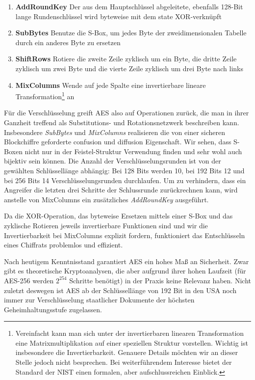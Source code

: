 \begin{enumerate}
	\small
	\item \textbf{AddRoundKey} Der aus dem Hauptschlüssel abgeleitete, ebenfalls 128-Bit lange Rundenschlüssel wird byteweise mit dem state XOR-verknüpft
	\item \textbf{SubBytes} Benutze die S-Box, um jedes Byte der zweidimensionalen Tabelle durch ein anderes Byte zu ersetzen
	\item \textbf{ShiftRows} Rotiere die zweite Zeile zyklisch um ein Byte, die dritte Zeile zyklisch um zwei Byte und die vierte Zeile zyklisch um drei Byte nach links
	\item \textbf{MixColumns} Wende auf jede Spalte eine invertierbare lineare Transformation\footnote{Vereinfacht kann man sich unter der invertierbaren linearen Transformation eine Matrixmultiplikation auf einer speziellen Struktur vorstellen. Wichtig ist insbesondere die Invertierbarkeit. Genauere Details möchten wir an dieser Stelle jedoch nicht besprechen. Bei weiterführendem Interesse bietet der Standard der NIST \cite{NIST_AES01} einen formalen, aber aufschlussreichen Einblick.} an
\end{enumerate}

Für die Verschlüsselung greift AES also auf Operationen zurück, die man in ihrer Ganzheit treffend als Substitutions- und Rotationsnetzwerk beschreiben kann. Insbesondere \textit{SubBytes} und \textit{MixColumns} realisieren die von einer sicheren Blockchiffre geforderte confusion und diffusion Eigenschaft. Wir sehen, dass S-Boxen nicht nur in der Feistel-Struktur Verwendung finden und sehr wohl auch bijektiv sein können.
Die Anzahl der Verschlüsselungsrunden ist von der gewählten Schlüssellänge abhängig: Bei 128 Bits werden 10, bei 192 Bits 12 und bei 256 Bits 14 Verschlüsselungsrunden durchlaufen. Um zu verhindern, dass ein Angreifer die letzten drei Schritte der Schlussrunde zurückrechnen kann, wird anstelle von MixColumns ein zusätzliches \textit{AddRoundKey} ausgeführt.

Da die XOR-Operation, das byteweise Ersetzen mittels einer S-Box und das zyklische Rotieren jeweils invertierbare Funktionen sind und wir die Invertierbarkeit bei MixColumns explizit fordern, funktioniert das Entschlüsseln eines Chiffrats problemlos und effizient.

Nach heutigem Kenntnisstand garantiert AES ein hohes Maß an Sicherheit. Zwar gibt es theoretische Kryptoanalysen, die aber aufgrund ihrer hohen Laufzeit (für AES-256 werden $2^{254}$ Schritte benötigt) in der Praxis keine Relevanz haben. Nicht zuletzt deswegen ist AES ab der Schlüssellänge von 192 Bit in den USA noch immer zur Verschlüsselung staatlicher Dokumente der höchsten Geheimhaltungsstufe zugelassen.

